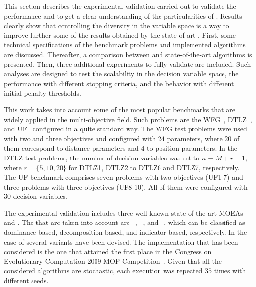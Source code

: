 This section describes the experimental validation carried out to validate the performance and
to get a clear understanding of the particularities of \VSDMOEA{}.
%
Results clearly show that controlling the diversity in the variable space is a way to improve further some of the results 
obtained by the state-of-art \MOEAS{}.
%
First, some technical specifications of the benchmark problems and implemented algorithms are discussed.
%
Thereafter, a comparison between \VSDMOEA{} and state-of-the-art algorithms is presented.
%
Then, three additional experiments to fully validate \VSDMOEA{} are included.
%
Such analyses are designed to test the scalability in the decision variable space, the performance with different stopping criteria, 
and the behavior with different initial penalty thresholds.

This work takes into account some of the most popular benchmarks that are widely applied in the multi-objective field.
%
Such problems are the WFG~\cite{Joel:WFG}, DTLZ~\cite{Joel:DTLZ}, and UF~\cite{Joel:CEC2009} configured in a quite
standard way.
%
The WFG test problems were used with two and three objectives
and configured with $24$ parameters, where $20$ of them correspond to distance parameters and $4$ to position parameters.
%
In the DTLZ test problems, the number of decision variables was set to $n=M+r-1$, where $r=\{5, 10, 20\}$ for DTLZ1, DTLZ2 to DTLZ6 and DTLZ7, respectively.
% 
The UF benchmark comprises seven problems with two objectives (UF1-7) and three problems with three objectives (UF8-10).
%
All of them were configured with $30$ decision variables.

The experimental validation includes three well-known state-of-the-art-MOEAs and \VSDMOEA{}.
%
The \MOEAS{} that are taken into account are \NSGAII{}~\cite{Joel:jMetal}, \MOEAD{}~\cite{MOEADCode}, and \RMOEA{}~\cite{R2EMOACode}, 
which can be classified as dominance-based, decomposition-based, and indicator-based, respectively.
%
In the case of \MOEAD{} several variants have been devised.
%
The \MOEAD{} implementation that has been considered is the one that attained the first place in the Congress on Evolutionary Computation 
2009 MOP Competition~\cite{zhang2009performance}.
%
Given that all the considered algorithms are stochastic, each execution was repeated $35$ times with different seeds.

